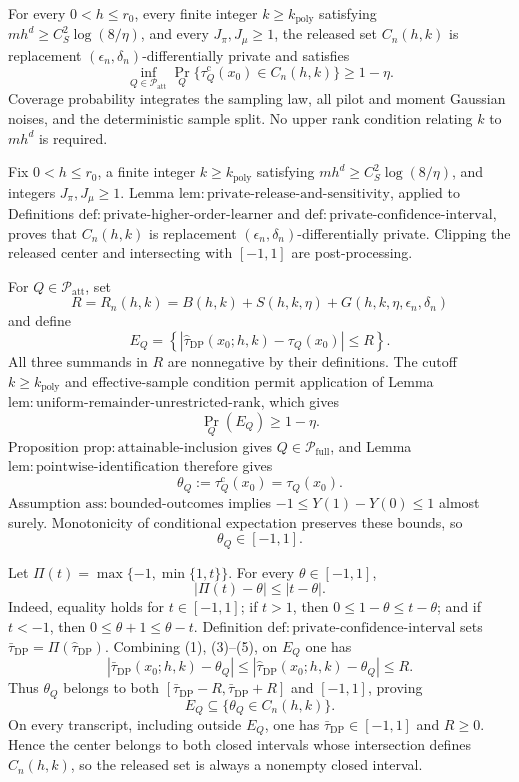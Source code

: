 For every \(0<h\le r_0\), every finite integer \(k\ge k_{\mathrm{poly}}\) satisfying \(m h^d\ge C_S^2\log(8/\eta)\), and every \(J_\pi,J_\mu\ge1\), the released set \(C_n(h,k)\) is replacement \((\epsilon_n,\delta_n)\)-differentially private and satisfies
\[
 \inf_{Q\in\mathcal P_{\mathrm{att}}}
 \Pr_Q\{\tau_Q^{\mathrm c}(x_0)\in C_n(h,k)\}\ge1-\eta.
\]
Coverage probability integrates the sampling law, all pilot and moment Gaussian noises, and the deterministic sample split.  No upper rank condition relating \(k\) to \(m h^d\) is required.

Fix \(0<h\le r_0\), a finite integer \(k\ge k_{\mathrm{poly}}\) satisfying \(mh^d\ge C_S^2\log(8/\eta)\), and integers \(J_\pi,J_\mu\ge1\).  Lemma \(\mathrm{lem{:}private\text{-}release\text{-}and\text{-}sensitivity}\), applied to Definitions \(\mathrm{def{:}private\text{-}higher\text{-}order\text{-}learner}\) and \(\mathrm{def{:}private\text{-}confidence\text{-}interval}\), proves that \(C_n(h,k)\) is replacement \((\epsilon_n,\delta_n)\)-differentially private.  Clipping the released center and intersecting with \([-1,1]\) are post-processing.

For \(Q\in\mathcal P_{\mathrm{att}}\), set
\[
 R=R_n(h,k)=B(h,k)+S(h,k,\eta)
      +G(h,k,\eta,\epsilon_n,\delta_n)
\]
and define
\[
 E_Q=\left\{
 |\widehat\tau_{\mathrm{DP}}(x_0;h,k)-\tau_Q(x_0)|\le R
 \right\}.
\tag{1}
\]
All three summands in \(R\) are nonnegative by their definitions.  The cutoff \(k\ge k_{\mathrm{poly}}\) and effective-sample condition permit application of Lemma \(\mathrm{lem{:}uniform\text{-}remainder\text{-}unrestricted\text{-}rank}\), which gives
\[
 \Pr_Q(E_Q)\ge1-\eta.
\tag{2}
\]
Proposition \(\mathrm{prop{:}attainable\text{-}inclusion}\) gives \(Q\in\mathcal P_{\mathrm{full}}\), and Lemma \(\mathrm{lem{:}pointwise\text{-}identification}\) therefore gives
\[
 \theta_Q:=\tau_Q^{\mathrm c}(x_0)=\tau_Q(x_0).
\tag{3}
\]
Assumption \(\mathrm{ass{:}bounded\text{-}outcomes}\) implies \(-1\le Y(1)-Y(0)\le1\) almost surely.  Monotonicity of conditional expectation preserves these bounds, so
\[
 \theta_Q\in[-1,1].
\tag{4}
\]

Let \(\Pi(t)=\max\{-1,\min\{1,t\}\}\).  For every \(\theta\in[-1,1]\),
\[
 |\Pi(t)-\theta|\le|t-\theta|.
\tag{5}
\]
Indeed, equality holds for \(t\in[-1,1]\); if \(t>1\), then \(0\le1-\theta\le t-\theta\); and if \(t<-1\), then \(0\le\theta+1\le\theta-t\).  Definition \(\mathrm{def{:}private\text{-}confidence\text{-}interval}\) sets \(\bar\tau_{\mathrm{DP}}=\Pi(\widehat\tau_{\mathrm{DP}})\).  Combining (1), (3)--(5), on \(E_Q\) one has
\[
 |\bar\tau_{\mathrm{DP}}(x_0;h,k)-\theta_Q|
 \le|\widehat\tau_{\mathrm{DP}}(x_0;h,k)-\theta_Q|
 \le R.
\tag{6}
\]
Thus \(\theta_Q\) belongs to both \([\bar\tau_{\mathrm{DP}}-R,\bar\tau_{\mathrm{DP}}+R]\) and \([-1,1]\), proving
\[
 E_Q\subseteq\{\theta_Q\in C_n(h,k)\}.
\tag{7}
\]
On every transcript, including outside \(E_Q\), one has \(\bar\tau_{\mathrm{DP}}\in[-1,1]\) and \(R\ge0\).  Hence the center belongs to both closed intervals whose intersection defines \(C_n(h,k)\), so the released set is always a nonempty closed interval.

